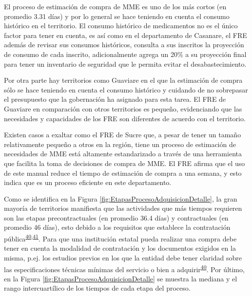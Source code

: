 \documentclass[
  oneside]{book}
\begin{document}
El proceso de estimación de compra de MME es uno de los más cortos (en promedio 3.31 días) y por lo general se hace teniendo en cuenta el consumo histórico en el territorio. El consumo histórico de medicamentos no es el único factor para tener en cuenta, es así como en el departamento de Casanare, el FRE además de revisar sus consumos históricos, consulta a sus inscritos la proyección de consumo de cada inscrito, adicionalmente agrega un 20\% a su proyección final para tener un inventario de seguridad que le permita evitar el desabastecimiento.

Por otra parte hay territorios como Guaviare en el que la estimación de compra sólo se hace teniendo en cuenta el consumo histórico y cuidando de no sobrepasar el presupuesto que la gobernación ha asignado para esta tarea. El FRE de Guaviare en comparación con otros territorios es pequeño, evidenciando que las necesidades y capacidades de los FRE son diferentes de acuerdo con el territorio.

Existen casos a exaltar como el FRE de Sucre que, a pesar de tener un tamaño relativamente pequeño a otros en la región, tiene un proceso de estimación de necesidades de MME está altamente estandarizado a través de una herramienta que facilita la toma de decisiones de compra de MME. El FRE afirma que el uso de este manual reduce el tiempo de estimación de compra a una semana, y esto indica que es un proceso eficiente en este departamento.

Como se identifica en la Figura \ref{fig:EtapasProcesoAdquisicionDetalle}, la gran mayoría de territorios manifiesta que las actividades que más tiempos requieren son las etapas precontractuales (en promedio 36.4 días) y contractuales (en promedio 46 días), esto debido a los requisitos que establece la contratación pública\textsuperscript{\protect\hyperlink{ref-CongresodelaRepublicadeColombia1993}{40},\protect\hyperlink{ref-CongresodelaRepublicadeColombia2007}{41}}. Para que una institución estatal pueda realizar una compra debe tener en cuenta la modalidad de contratación y los documentos exigidos en la misma, p.ej. los estudios previos en los que la entidad debe tener claridad sobre las especificaciones técnicas mínimas del servicio o bien a adquirir\textsuperscript{\protect\hyperlink{ref-CongresodelaRepublicadeColombia1993}{40}}. Por último, en la Figura \ref{fig:EtapasProcesoAdquisicionDetalle} se muestra la mediana y el rango intercuartílico de los tiempos de cada etapa del proceso.
\end{document}
